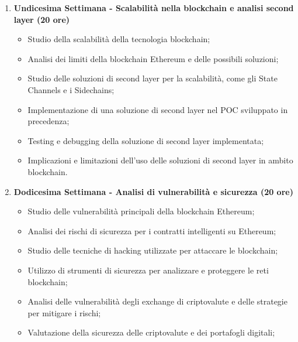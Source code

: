{\begin{enumerate}
        \item \textbf{Undicesima Settimana - Scalabilità nella blockchain e analisi second layer (20 ore)}
        \begin{itemize}
            \item Studio della scalabilità della tecnologia blockchain;
            \item Analisi dei limiti della blockchain Ethereum e delle possibili soluzioni;
            \item Studio delle soluzioni di second layer per la scalabilità, come gli State Channels e i Sidechains;
            \item Implementazione di una soluzione di second layer nel POC sviluppato in precedenza;
            \item Testing e debugging della soluzione di second layer implementata;
            \newpage 
            \item Implicazioni e limitazioni dell'uso delle soluzioni di second layer in ambito blockchain.
        \end{itemize}

        \item \textbf{Dodicesima Settimana - Analisi di vulnerabilità e sicurezza (20 ore)}
        \begin{itemize}
            \item Studio delle vulnerabilità principali della blockchain Ethereum;
            \item Analisi dei rischi di sicurezza per i contratti intelligenti su Ethereum;
            \item Studio delle tecniche di hacking utilizzate per attaccare le blockchain;
            \item Utilizzo di strumenti di sicurezza per analizzare e proteggere le reti blockchain;
            \item Analisi delle vulnerabilità degli exchange di criptovalute e delle strategie per mitigare i rischi;
            \item Valutazione della sicurezza delle criptovalute e dei portafogli digitali;
        \end{itemize}
        

\end{enumerate}}
